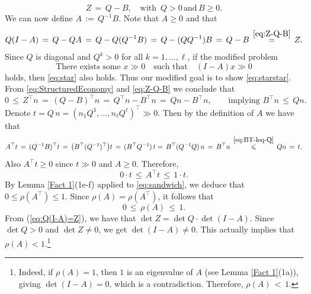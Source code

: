 \documentclass[11pt,fleqn]{article}
\begin{document}
\begin{equation}\label{eq:Z-Q-B}
Z \, =\,  Q - B, \quad \mbox{with }\, Q> 0\,\mbox{and}\,  B\geqslant 0.
\end{equation}
We can now define $A \, :=\,  Q^{-1} B$. Note that $A \geqslant 0$ and that
\begin{equation}\label{eq:Q(I-A)=Z}
Q(I-A) \, =\,  Q - QA \, = \,  Q - Q(Q^{-1}B) \, =\,  Q - (QQ^{-1})B \, =\,  Q - B \, \stackrel{\eqref{eq:Z-Q-B}}{=}\,  Z.
\end{equation}
Since $Q$ is diagonal and $Q^k>0$ for all $k=1, \ldots, \ell$, if the modified problem
\begin{equation}\label{eq:starstar}
\mbox{There exists some } x\gg 0 \quad\text{such that}\quad (I-A)x \gg 0
\end{equation}
holds, then \eqref{eq:star} also holds.  Thus our modified goal is to show \eqref{eq:starstar}.
\\[1ex]
From \eqref{eq:StructuredEconomy} and \eqref{eq:Z-Q-B} we conclude that
\begin{equation}\label{eq:BT-leq-Q}
0 \, \leqslant \,  Z^{\top} n \, =\,  (Q-B)^{\top} n \, =\,  Q^{\top} n - B^{\top} n \, =\,  Qn - B^{\top} n, \qquad \mbox{implying } B^{\top} n \, \leqslant \,  Q n.
\end{equation}
Denote $t = Q \, n = \left( n_1 Q^1 , \ldots , n_\ell Q^\ell \right)^\top \gg 0$. Then by the definition of $A$ we have that
\[
A^{\top} t \, =\,  (Q^{-1}B)^{\top} t \, =\,  \bigl(B^{\top}(Q^{-1})^{\top}\bigr) t  \, =\,  (B^{\top} Q^{-1})\, t  =\,  B^{\top}(Q^{-1}Q)\,n \, =\,  B^{\top} n\, \stackrel{\eqref{eq:BT-leq-Q}}{\leqslant}\,  Qn  \, = \,  t .
\]
Also $A^{\top} t \geqslant 0$ since $t \gg 0$ and $A \geqslant 0$.  Therefore,
\begin{equation}\label{eq:sandwich}
0\cdot t \, \leqslant \,  A^{\top} t \, \leqslant \,  1 \cdot t .
\end{equation}
By Lemma \ref{Fact 1}(1e-f) applied to \eqref{eq:sandwich}, we deduce that $0 \leqslant \rho(A^{\top}) \leqslant 1$. Since $\rho(A) = \rho(A^{\top})$, it follows that
\[ 0 \, \leqslant \,  \rho(A) \, \leqslant \,  1.\]
From (\ref{eq:Q(I-A)=Z}), we have that $\det Z = \det Q \cdot \det(I-A)$. Since $\det Q > 0$ and $\det Z \neq 0$, we get $\det(I-A)\neq 0$. This actually implies that $\rho(A) < 1$.\footnote{Indeed, if $\rho(A) = 1$, then $1$ is an eigenvalue of $A$ (see Lemma \ref{Fact 1}(1a)),  giving $\det(I-A)=0$, which is a contradiction. Therefore, $\rho(A) \, <\,  1.$}
\end{document}
